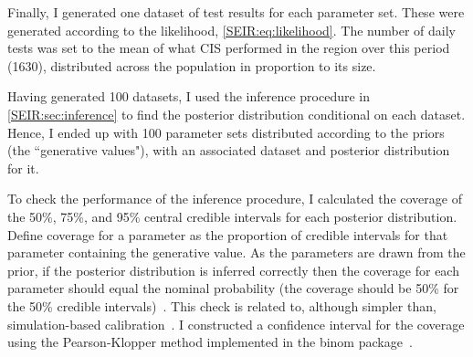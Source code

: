 \documentclass[thesis.tex]{subfiles}
\begin{document}
Finally, I generated one dataset of test results for each parameter set.
These were generated according to the likelihood, \cref{SEIR:eq:likelihood}.
The number of daily tests was set to the mean of what CIS performed in the region over this period (1630), distributed across the population in proportion to its size.

Having generated 100 datasets, I used the inference procedure in \cref{SEIR:sec:inference} to find the posterior distribution conditional on each dataset.
Hence, I ended up with 100 parameter sets distributed according to the priors (the ``generative values"), with an associated dataset and posterior distribution for it.

To check the performance of the inference procedure, I calculated the coverage of the 50\%, 75\%, and 95\% central credible intervals for each posterior distribution.
Define coverage for a parameter as the proportion of credible intervals for that parameter containing the generative value.
As the parameters are drawn from the prior, if the posterior distribution is inferred correctly then the coverage for each parameter should equal the nominal probability (\eg the coverage should be 50\% for the 50\% credible intervals)~\autocite{cookValidation}.
This check is related to, although simpler than, simulation-based calibration~\autocite{taltsValidating}.
I constructed a confidence interval for the coverage using the Pearson-Klopper method implemented in the binom package~\autocite{binom1-1}.
\end{document}
